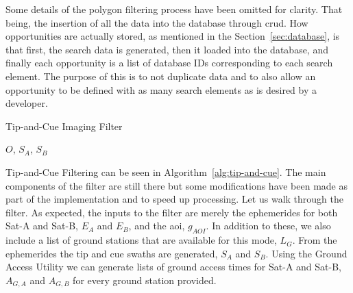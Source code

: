 Some details of the polygon filtering process have been omitted for clarity.
That being, the insertion of all the data into the database through \gls{crud}.
How opportunities are actually stored, as mentioned in the
Section~\ref{sec:database}, is that first, the search data is generated, then
it loaded into the database, and finally each opportunity is a list of database
IDs corresponding to each search element. The purpose of this is to not
duplicate data and to also allow an opportunity to be defined with as many
search elements as is desired by a developer.


\begin{algorithm} 
    \caption{Tip-and-Cue Imaging Filter}
    \label{alg:tip-and-cue} 
    \begin{algorithmic}[1] 

	     
	     

	     

	     



		 


		\EndIf

	    \EndFor

	\State \Return $O$, $S_A$, $S_B$
	\EndFunction
    \end{algorithmic}
\end{algorithm}

Tip-and-Cue Filtering can be seen in Algorithm~\ref{alg:tip-and-cue}. The main
components of the filter are still there but some modifications have been made
as part of the implementation and to speed up processing. Let us walk through
the filter. As expected, the inputs to the filter are merely the ephemerides
for both Sat-A and Sat-B, $E_A$ and $E_B$, and the \gls{aoi}, $g_{AOI}$. In
addition to these, we also include a list of ground stations that are available
for this mode, $L_G$. From the ephemerides the tip and cue swaths are
generated, $S_A$ and $S_B$.  Using the Ground Access Utility we can generate
lists of ground access times for Sat-A and Sat-B, $A_{G,A}$ and $A_{G,B}$ for
every ground station provided. 

